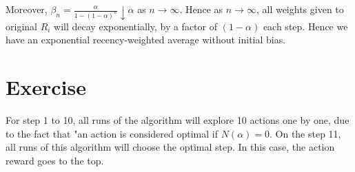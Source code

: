 \documentclass[11pt,a4paper]{report}
\begin{document}
Moreover, $\beta_n =\frac{\alpha}{1-(1-\alpha)^n}\downarrow \alpha $ as  $n \to \infty $. Hence as $n\to \infty $, all weights given to original $R_i$ will decay exponentially, by a factor of $(1-\alpha)$ each step. Hence we have an exponential recency-weighted average without initial bias.                                                                                                                                                                                                                                                                                                                                                                                                                                                                                                                                                                                                                                                                                                                                                                                                                                                                                                                                                                                                                                                                                                                                                                                                                                                                                                                                                                                                                                                                                                                                                                                                                                                                                                                                                                                                                                                                                                                                                                                                                                                                                                       

\section{Exercise}

For step 1 to 10, all runs of the algorithm will explore 10 actions one by one, due to the fact that "an action is considered optimal if $N(\alpha) = 0$. On the step 11, all runs of this algorithm will choose the optimal step. In this case, the action reward goes to the top.
\end{document}
